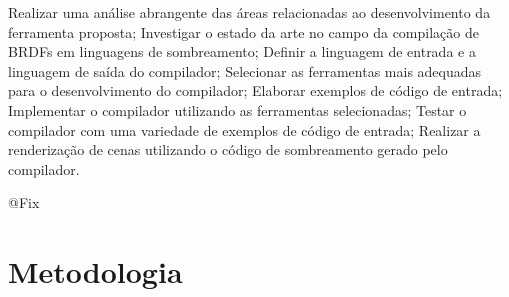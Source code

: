 \documentclass[english, 
               brazil, 
               bsc] %
               {dcomp-abntex2}
\begin{document}
Realizar uma análise abrangente das áreas relacionadas ao desenvolvimento da ferramenta proposta;
Investigar o estado da arte no campo da compilação de BRDFs em linguagens de sombreamento;
Definir a linguagem de entrada e a linguagem de saída do compilador;
Selecionar as ferramentas mais adequadas para o desenvolvimento do compilador;
Elaborar exemplos de código de entrada;
Implementar o compilador utilizando as ferramentas selecionadas;
Testar o compilador com uma variedade de exemplos de código de entrada;
Realizar a renderização de cenas utilizando o código de sombreamento gerado pelo compilador.

@Fix

\section{Metodologia}




% 
% 
% 
% 
% 




\postextual

\renewcommand{\chapnumfont}{\chaptitlefont}
\renewcommand{\afterchapternum}{}


\end{document}
